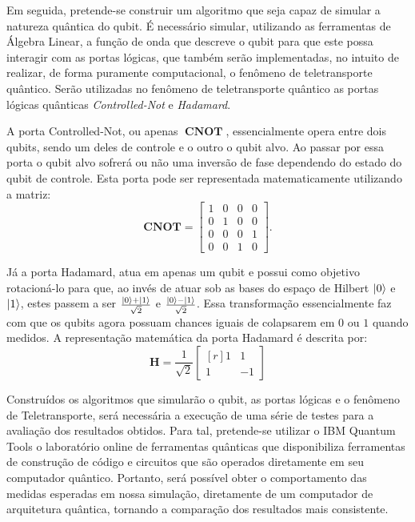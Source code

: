 \documentclass[12pt,oneside,brazil,hidelinks,article,sumario=tradicional,a4paper]{abntex2}
\DeclareMathOperator{\CNOT}{\mathbf{CNOT}}
\begin{document}
Em seguida, pretende-se construir um algoritmo que seja capaz de simular a natureza quântica do qubit. É necessário simular, utilizando as ferramentas de Álgebra Linear, a função de onda que descreve o qubit para que este possa interagir com as portas lógicas, que também serão implementadas, no intuito de realizar, de forma puramente computacional, o fenômeno de teletransporte quântico. Serão utilizadas no fenômeno de teletransporte quântico as portas lógicas quânticas \textit{Controlled-Not} e \textit{Hadamard}.

A porta Controlled-Not, ou apenas \(\CNOT\), essencialmente opera entre dois qubits, sendo um deles de controle e o outro o qubit alvo. Ao passar por essa porta o qubit alvo sofrerá ou não uma inversão de fase dependendo do estado do qubit de controle. Esta porta pode ser representada matematicamente utilizando a matriz:
\begin{equation}\label{CNOTMATRIX}
  \mathbf{CNOT}=\begin{bmatrix}
                  1 & 0 & 0 & 0\\
                  0 & 1 & 0 & 0\\
                  0 & 0 & 0 & 1\\
                  0 & 0 & 1 & 0
                \end{bmatrix}.
              \end{equation}

Já a porta Hadamard, atua em apenas um qubit e possui como objetivo rotacioná-lo para que, ao invés de atuar sob as bases do espaço de Hilbert $\ket{0}$ e $\ket{1}$, estes passem a ser $\frac{\ket{0} + \ket{1}}{\sqrt{2}}$ e $\frac{\ket{0} - \ket{1}}{\sqrt{2}}$. Essa transformação essencialmente faz com que os qubits agora possuam chances iguais de colapsarem em \(0\) ou \(1\) quando medidos. A representação matemática da porta Hadamard é descrita por:
\begin{equation}\label{HADAMARDMATRIX}
  \mathbf{H}= \frac{1}{\sqrt{2}}\begin{bmatrix*}[r]
                                  1 & 1 \\
                                  1 & -1
                                \end{bmatrix*}
                              \end{equation}

Construídos os algoritmos que simularão o qubit, as portas lógicas e o fenômeno de Teletransporte, será necessária a execução de uma série de testes para a avaliação dos resultados obtidos. Para tal, pretende-se utilizar o IBM Quantum Tools o laboratório online de ferramentas quânticas que disponibiliza ferramentas de construção de código e circuitos que são operados diretamente em seu computador quântico. Portanto, será possível obter o comportamento das medidas esperadas em nossa simulação, diretamente de um computador de arquitetura quântica, tornando a comparação dos resultados mais consistente.
\end{document}
